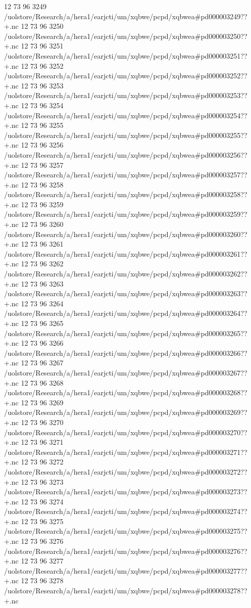 12 73 96
3249
/uolstore/Research/a/hera1/earjcti/um/xqbwe/pcpd/xqbwea#pd000003249??+.nc
12 73 96
3250
/uolstore/Research/a/hera1/earjcti/um/xqbwe/pcpd/xqbwea#pd000003250??+.nc
12 73 96
3251
/uolstore/Research/a/hera1/earjcti/um/xqbwe/pcpd/xqbwea#pd000003251??+.nc
12 73 96
3252
/uolstore/Research/a/hera1/earjcti/um/xqbwe/pcpd/xqbwea#pd000003252??+.nc
12 73 96
3253
/uolstore/Research/a/hera1/earjcti/um/xqbwe/pcpd/xqbwea#pd000003253??+.nc
12 73 96
3254
/uolstore/Research/a/hera1/earjcti/um/xqbwe/pcpd/xqbwea#pd000003254??+.nc
12 73 96
3255
/uolstore/Research/a/hera1/earjcti/um/xqbwe/pcpd/xqbwea#pd000003255??+.nc
12 73 96
3256
/uolstore/Research/a/hera1/earjcti/um/xqbwe/pcpd/xqbwea#pd000003256??+.nc
12 73 96
3257
/uolstore/Research/a/hera1/earjcti/um/xqbwe/pcpd/xqbwea#pd000003257??+.nc
12 73 96
3258
/uolstore/Research/a/hera1/earjcti/um/xqbwe/pcpd/xqbwea#pd000003258??+.nc
12 73 96
3259
/uolstore/Research/a/hera1/earjcti/um/xqbwe/pcpd/xqbwea#pd000003259??+.nc
12 73 96
3260
/uolstore/Research/a/hera1/earjcti/um/xqbwe/pcpd/xqbwea#pd000003260??+.nc
12 73 96
3261
/uolstore/Research/a/hera1/earjcti/um/xqbwe/pcpd/xqbwea#pd000003261??+.nc
12 73 96
3262
/uolstore/Research/a/hera1/earjcti/um/xqbwe/pcpd/xqbwea#pd000003262??+.nc
12 73 96
3263
/uolstore/Research/a/hera1/earjcti/um/xqbwe/pcpd/xqbwea#pd000003263??+.nc
12 73 96
3264
/uolstore/Research/a/hera1/earjcti/um/xqbwe/pcpd/xqbwea#pd000003264??+.nc
12 73 96
3265
/uolstore/Research/a/hera1/earjcti/um/xqbwe/pcpd/xqbwea#pd000003265??+.nc
12 73 96
3266
/uolstore/Research/a/hera1/earjcti/um/xqbwe/pcpd/xqbwea#pd000003266??+.nc
12 73 96
3267
/uolstore/Research/a/hera1/earjcti/um/xqbwe/pcpd/xqbwea#pd000003267??+.nc
12 73 96
3268
/uolstore/Research/a/hera1/earjcti/um/xqbwe/pcpd/xqbwea#pd000003268??+.nc
12 73 96
3269
/uolstore/Research/a/hera1/earjcti/um/xqbwe/pcpd/xqbwea#pd000003269??+.nc
12 73 96
3270
/uolstore/Research/a/hera1/earjcti/um/xqbwe/pcpd/xqbwea#pd000003270??+.nc
12 73 96
3271
/uolstore/Research/a/hera1/earjcti/um/xqbwe/pcpd/xqbwea#pd000003271??+.nc
12 73 96
3272
/uolstore/Research/a/hera1/earjcti/um/xqbwe/pcpd/xqbwea#pd000003272??+.nc
12 73 96
3273
/uolstore/Research/a/hera1/earjcti/um/xqbwe/pcpd/xqbwea#pd000003273??+.nc
12 73 96
3274
/uolstore/Research/a/hera1/earjcti/um/xqbwe/pcpd/xqbwea#pd000003274??+.nc
12 73 96
3275
/uolstore/Research/a/hera1/earjcti/um/xqbwe/pcpd/xqbwea#pd000003275??+.nc
12 73 96
3276
/uolstore/Research/a/hera1/earjcti/um/xqbwe/pcpd/xqbwea#pd000003276??+.nc
12 73 96
3277
/uolstore/Research/a/hera1/earjcti/um/xqbwe/pcpd/xqbwea#pd000003277??+.nc
12 73 96
3278
/uolstore/Research/a/hera1/earjcti/um/xqbwe/pcpd/xqbwea#pd000003278??+.nc
